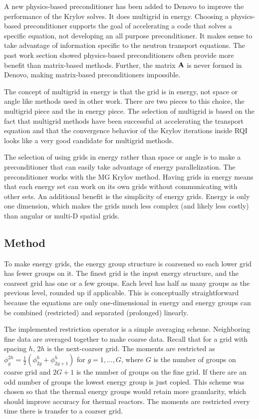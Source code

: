 A new physics-based preconditioner has been added to Denovo to improve the performance of the Krylov solves. It does multigrid in energy. Choosing a physics-based preconditioner supports the goal of accelerating a code that solves a specific equation, not developing an all purpose preconditioner. It makes sense to take advantage of information specific to the neutron transport equations. The past work section showed physics-based preconditioners often provide more benefit than matrix-based methods. Further, the matrix $\mathbf{A}$ is never formed in Denovo, making matrix-based preconditioners impossible. 

The concept of multigrid in energy is that the grid is in energy, not space or angle like methods used in other work. There are two pieces to this choice, the multigrid piece and the in energy piece. The selection of multigrid is based on the fact that multigrid methods have been successful at accelerating the transport equation and that the convergence behavior of the Krylov iterations inside RQI looks like a very good candidate for multigrid methods. 

The selection of using grids in energy rather than space or angle is to make a preconditioner that can easily take advantage of energy parallelization. The preconditioner works with the MG Krylov method. Having grids in energy means that each energy set can work on its own grids without communicating with other sets. An additional benefit is the simplicity of energy grids. Energy is only one dimension, which makes the grids much less complex (and likely less costly) than angular or multi-D spatial grids. 

\subsection{Method}
To make energy grids, the energy group structure is coarsened so each lower grid has fewer groups on it. The finest grid is the input energy structure, and the coarsest grid has one or a few groups. Each level has half as many groups as the previous level, rounded up if applicable. This is conceptually straightforward because the equations are only one-dimensional in energy and energy groups can be combined (restricted) and separated (prolonged) linearly. 

The implemented restriction operator is a simple averaging scheme. Neighboring fine data are averaged together to make coarse data. Recall that for a grid with spacing $h$, $2h$ is the next-coarser grid. The moments are restricted as $\phi_{g}^{2h} = \frac{1}{2}(\phi_{2g}^{h} + \phi_{2g+1}^{h})$ for $g = 1,...,G$, where $G$ is the number of groups on coarse grid and $2G+1$ is the number of groups on the fine grid. If there are an odd number of groups the lowest energy group is just copied. This scheme was chosen so that the thermal energy groups would retain more granularity, which should improve accuracy for thermal reactors. The moments are restricted every time there is transfer to a coarser grid.

